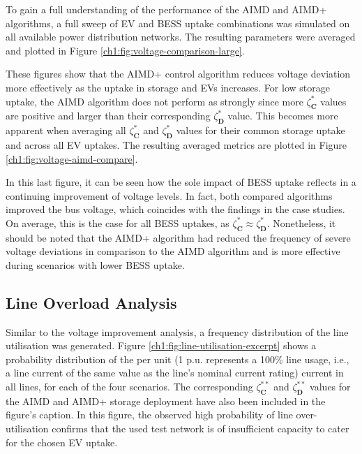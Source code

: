 

To gain a full understanding of the performance of the AIMD and AIMD+ algorithms, a full sweep of EV and BESS uptake combinations was simulated on all available power distribution networks. The resulting parameters were averaged and plotted in Figure \ref{ch1:fig:voltage-comparison-large}.



These figures show that the AIMD+ control algorithm reduces voltage deviation more effectively as the uptake in storage and EVs increases. For low storage uptake, the AIMD algorithm does not perform as strongly since more $\zeta_\textbf{C}^{*}$ values are positive and larger than their corresponding $\zeta_\textbf{D}^{*}$ value. This becomes more apparent when averaging all $\zeta_\textbf{C}^{*}$ and $\zeta_\textbf{D}^{*}$ values for their common storage uptake and across all EV uptakes. The resulting averaged metrics are plotted in Figure \ref{ch1:fig:voltage-aimd-compare}.

In this last figure, it can be seen how the sole impact of BESS uptake reflects in a continuing improvement of voltage levels. In fact, both compared algorithms improved the bus voltage, which coincides with the findings in the case studies. On average, this is the case for all BESS uptakes, as $\zeta_\textbf{C}^{*} \approx \zeta_\textbf{D}^{*}$. Nonetheless, it should be noted that the AIMD+ algorithm had reduced the frequency of severe voltage deviations in comparison to the AIMD algorithm and is more effective during scenarios with lower BESS uptake.



\subsection{Line Overload Analysis}

Similar to the voltage improvement analysis, a frequency distribution of the line utilisation was generated. Figure \ref{ch1:fig:line-utilisation-excerpt} shows a probability distribution of the per unit (1 p.u. represents a 100\% line usage, i.e., a line current of the same value as the line's nominal current rating) current in all lines, for each of the four scenarios. The corresponding $\zeta_\textbf{C}^{**}$ and $\zeta_\textbf{D}^{**}$ values for the AIMD and AIMD+ storage deployment have also been included in the figure's caption. In this figure, the observed high probability of line over-utilisation confirms that the used test network is of insufficient capacity to cater for the chosen EV uptake.

